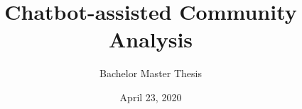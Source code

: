 \newcommand*{\BACHELOR}{}
\title{Chatbot-assisted Community Analysis}
\subtitle{\ifdefined\BACHELOR Bachelor \else Master \fi Thesis \ifdefined\PROPOSAL
		\PROPOSAL
	\fi}
\date{April 23, 2020}
\newcommand{\firstname}{Ben Aziz}
\newcommand{\lastname}{Lakhoune}
\newcommand{\matrNo}{380163}
\newcommand{\email}{ben.lakhoune@rwth-aachen.de}
\newcommand{\studyProgram}{\ifdefined\BACHELOR Bachelor \else Master \fi Computer Science}

\newcommand{\firstsupervisor}{PD Dr. Ralf Klamma}
\newcommand{\firstsupervisorchair}{Chair of Information Systems}
\newcommand{\firstsupervisoruniversity}{RWTH Aachen University}

\newcommand{\secondsupervisor}{Prof. Dr. Matthias Jarke}
\newcommand{\secondsupervisorchair}{Chair of Information Systems}
\newcommand{\secondsupervisoruniversity}{RWTH Aachen University}


\newcommand{\firstadvisor}{Alexander Neumann}
\newcommand{\firstadvisorchair}{Chair of Information Systems}
\newcommand{\firstadvisoruniversity}{RWTH Aachen University}

